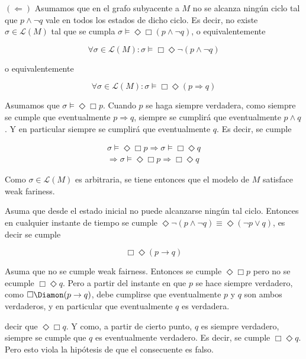\documentclass[a4paper, 12pt]{article}
\begin{document}
$(\Leftarrow)$ Asumamos que en el grafo subyacente a $M$ no se alcanza ningún
ciclo tal que $p \land \neg q$ vale en todos los estados de dicho ciclo. Es
decir, no existe $\sigma \in \mathcal{L}(M)$ tal que se cumpla $\sigma \vDash
\Diamond \Box (p \land \neg q)$, o equivalentemente 

\begin{equation*}
    \forall  \sigma \in \mathcal{L}(M) : \sigma \vDash \Box \Diamond \neg (p
    \land  \neg q)
\end{equation*}

o equivalentemente 

\begin{equation*}
    \forall  \sigma \in \mathcal{L}(M) : \sigma \vDash \Box \Diamond (p
    \Rightarrow q)
\end{equation*}

Asumamos que $\sigma \vDash \Diamond \Box p$. Cuando $p$ se haga siempre
verdadera, como siempre se cumple que eventualmente $p \Rightarrow q$, siempre
se cumplirá que eventualmente $p \land  q$. Y en particular siempre se cumplirá
que eventualmente $q$. Es decir, se cumple 

\begin{align*}
    \sigma \vDash \Diamond \Box p \Rightarrow \sigma \vDash \Box \Diamond q \\ 
    \Rightarrow \sigma \vDash \Diamond \Box p \Rightarrow \Box \Diamond q
\end{align*}

Como $\sigma \in \mathcal{L}(M)$ es arbitraria, se tiene entonces que el modelo
de $M$ satisface weak fariness.


Asuma que desde el estado inicial no puede alcanzarse ningún tal
ciclo. Entonces en cualquier instante de tiempo se cumple $\Diamond \neg(p \land
\neg q) \equiv \Diamond ( \neg p \lor  q )$, es decir se cumple 

\begin{equation*}
    \Box \Diamond (p \to q)
\end{equation*}

Asuma que no se cumple weak fairness. Entonces se cumple $\Diamond \Box p$ pero
no se ecumple $\Box \Diamond q$. Pero a partir del instante en que $p$ se hace
siempre verdadero, como $\Box \Diamon(p \to q)$, debe cumplirse que
eventualmente $p$ y $q$ son ambos verdaderos, y en particular que eventualmente
$q$ es verdadera. 

decir que $\Diamond \Box q$. Y como, a partir de cierto punto, $q$ es siempre
verdadero, siempre se cumple que $q$ es eventualmente verdadero. Es decir, se
cumple $\Box \Diamond q$. Pero esto viola la hipótesis de que el consecuente es
falso.
\end{document}
